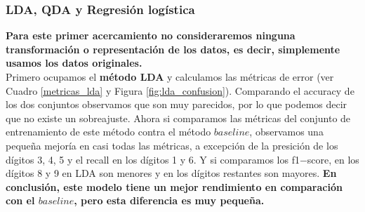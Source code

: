 \documentclass[paper=letter, fontsize=11pt]{scrartcl}
\numberwithin{equation}{section} %
\numberwithin{figure}{section} %
\numberwithin{table}{section} %
\begin{document}
\subsubsection{LDA, QDA y Regresión logística}
\textbf{Para este primer acercamiento no consideraremos ninguna transformación o representación de los datos, es decir, simplemente usamos los datos originales.}\\
Primero ocupamos el \textbf{método LDA} y calculamos las métricas de error (ver Cuadro \ref{metricas_lda} y Figura \ref{fig:lda_confusion}). Comparando el accuracy de los dos conjuntos observamos que son muy parecidos, por lo que podemos decir que no existe un sobreajuste. Ahora si comparamos las métricas del conjunto de entrenamiento de este método contra el método $baseline$,  observamos una pequeña mejoría en casi todas las métricas, a excepción de la presición de los dígitos 3, 4, 5 y el recall en los dígitos 1 y 6. Y si comparamos los f1$-$score, en los dígitos 8 y 9 en LDA son menores y en los dígitos restantes son mayores. \textbf{En conclusión, este modelo tiene un mejor rendimiento en comparación con el $baseline$, pero esta diferencia es muy pequeña.}
\end{document}
